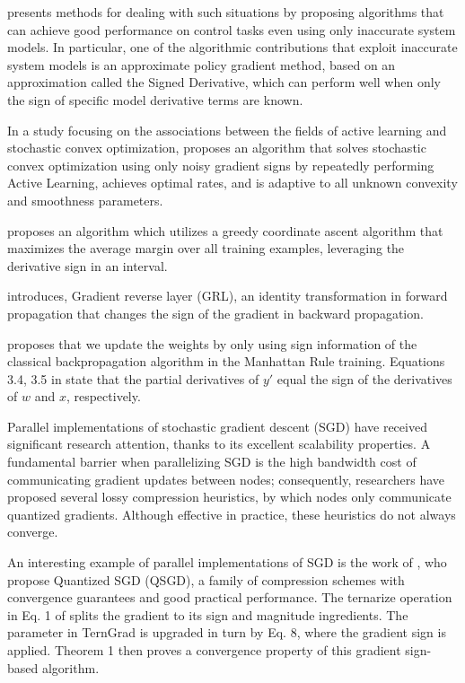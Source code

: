 \documentclass[11pt]{book}
\begin{document}
\cite{kolter2010learning} presents methods for dealing with such
situations by proposing algorithms that can achieve good performance
on control tasks even using only inaccurate system models. In particular,
one of the algorithmic contributions that exploit inaccurate system
models is an approximate policy gradient method, based on an approximation
called the Signed Derivative, which can perform well when only the
sign of specific model derivative terms are known. 

In a study focusing on the associations between the fields of active learning and stochastic convex optimization, \cite{ramdas2013algorithmic} proposes an algorithm that solves stochastic
convex optimization using only noisy gradient signs by repeatedly
performing Active Learning, achieves optimal rates, and is adaptive
to all unknown convexity and smoothness parameters. 

\cite{zhai2013direct} proposes an algorithm which utilizes a greedy coordinate
ascent algorithm that maximizes the average margin over all training
examples, leveraging the derivative sign in an interval.

\cite{ganin2015unsupervised} introduces, Gradient reverse layer (GRL),
an identity transformation in forward propagation that changes the
sign of the gradient in backward propagation.

\cite{zamanidoost2015manhattan} proposes that we update the weights
by only using sign information of the classical backpropagation algorithm
in the Manhattan Rule training. Equations 3.4, 3.5 in \cite{wang2016study}
state that the partial derivatives of $y'$ equal the sign of the
derivatives of $w$ and $x$, respectively.

Parallel implementations of stochastic gradient descent (SGD) have
received significant research attention, thanks to its excellent scalability
properties. A fundamental barrier when parallelizing SGD is the high
bandwidth cost of communicating gradient updates between nodes; consequently,
researchers have proposed several lossy compression heuristics, by
which nodes only communicate quantized gradients. Although effective
in practice, these heuristics do not always converge.

An interesting example of parallel implementations of SGD is the work of \cite{alistarh2017qsgd}, who propose Quantized SGD (QSGD), a family of
compression schemes with convergence guarantees and good practical
performance. The \textquotedbl ternarize\textquotedbl{} operation in
Eq. 1 of \cite{wen2017terngrad} splits the gradient to its sign and
magnitude ingredients. The parameter in TernGrad is upgraded in turn
by Eq. 8, where the gradient sign is applied. Theorem 1 then proves
a convergence property of this gradient sign-based algorithm.
\end{document}
